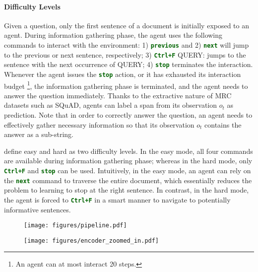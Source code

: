 \documentclass[11pt]{article}
\newcommand{\code}[1]{\texttt{#1}}
\newcommand{\cmd}[1]{\textcolor{darkgreen}{\textbf{\small{\code{#1}}}}}
\newcommand{\imrc}{iMRC\xspace}
\newcommand{\squad}{SQuAD\xspace}
\newcommand{\ctrlf}{Ctrl+F\xspace}
\newcommand{\query}{\textcolor{orange2}{\small{QUERY}}\xspace}
\begin{document}
\paragraph{Difficulty Levels}
Given a question, only the first sentence of a document is initially exposed to an agent.
During information gathering phase, the agent uses the following commands to interact with the environment:
1) \cmd{previous} and 2) \cmd{next} will jump to the previous or next sentence, respectively; 
3) \cmd{\ctrlf} \query: jumps to the sentence with the next occurrence of \query; 4) \cmd{stop} terminates the interaction.
Whenever the agent issues the \cmd{stop} action, or it has exhausted its interaction budget \footnote{An agent can at most interact 20 steps.}, the information gathering phase is terminated, and the agent needs to answer the question immediately.
Thanks to the extractive nature of MRC datasets such as \squad, agents can label a span from its observation $o_t$ as prediction. 
Note that in order to correctly answer the question, an agent needs to effectively gather necessary information so that its observation $o_t$ contains the answer as a sub-string.

\citet{yuan2020imrc} define easy and hard as two difficulty levels.
In the easy mode, all four commands are available during information gathering phase; whereas in the hard mode, only \cmd{\ctrlf} and \cmd{stop} can be used.
Intuitively, in the easy mode, an agent can rely on the \cmd{next} command to traverse the entire document, which essentially reduces the problem to learning to stop at the right sentence.
In contrast, in the hard mode, the agent is forced to \cmd{\ctrlf} in a smart manner to navigate to potentially informative sentences.


\begin{figure*}[t!]
\centering
\begin{subfigure}{.5\textwidth}
  \centering
  \texttt{[image: figures/pipeline.pdf]}
\end{subfigure}%
\begin{subfigure}{.5\textwidth}
  \centering
  \texttt{[image: figures/encoder\_zoomed\_in.pdf]}
\end{subfigure}
\caption{\textbf{Left:} an overview of our agent. We propose to use graph representations as an additional input modality to the \imrc agent \citep{yuan2020imrc}. \textbf{Right:} a zoomed in view of our encoder module, extended from \imrc.}
\label{fig:pipeline}
\end{figure*}
\end{document}
